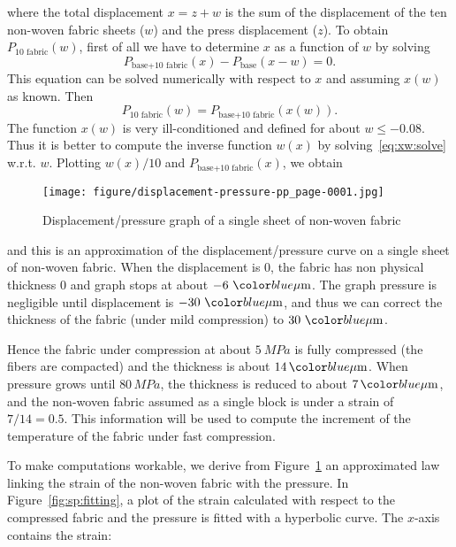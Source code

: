 where the total displacement $x=z+w$ is the sum of the displacement of the ten non-woven fabric sheets ($w$) and the press displacement ($z$). To obtain $P_{\textrm{10 fabric}}(w)$, first of all we have to determine $x$ as a function of $w$ by solving
\begin{equation}\label{eq:xw:solve}
  P_{\textrm{base}+\textrm{10 fabric}}(x)-
  P_{\textrm{base}}(x-w)= 0.
\end{equation}
This equation can be solved numerically with respect to $x$ and assuming $x(w)$ as known. Then
\[
  P_{\textrm{10 fabric}}(w) = P_{\textrm{base}+\textrm{10 fabric}}(x(w)).
\]
The function $x(w)$ is very ill-conditioned and defined for about $w\leq-0.08$. Thus it is better to compute the inverse function $w(x)$ by solving~\eqref{eq:xw:solve} w.r.t. $w$. Plotting $w(x)/10$ and $P_{\textrm{base}+\textrm{10 fabric}}(x)$, we obtain
\begin{figure}[H]
  \begin{center}
    \texttt{[image: figure/displacement-pressure-pp\_page-0001.jpg]}
  \end{center}
  \caption{Displacement/pressure graph of a single sheet of non-woven fabric}
  \label{fig:pp:pressure}
\end{figure}
and this is an approximation of the displacement/pressure curve on a single sheet of non-woven fabric. When the displacement is $0$, the fabric has non physical thickness $0$ and graph stops at about $-6 \ \unit{$\mu$m}$. The graph pressure is negligible until displacement is $-30 \ \unit{$\mu$m}$, and thus we can correct the thickness of the fabric (under mild compression) to $30 \ \unit{$\mu$m}$.
\par
Hence the fabric under compression at about $5 \ \unit{MPa}$ is fully compressed (the fibers are compacted) and the thickness is about $14\,\unit{$\mu$m}$. When pressure grows until $80\,\unit{MPa}$, the thickness is reduced to about $7\,\unit{$\mu$m}$, and the non-woven fabric assumed as a single block is under a strain of $7/14=0.5$. This information will be used to compute the increment of the temperature of the fabric under fast compression.
\par
To make computations workable, we derive from Figure~\ref{fig:pp:pressure} an approximated law linking the strain of the non-woven fabric with the pressure. In Figure~\ref{fig:sp:fitting}, a plot of the strain calculated with respect to the compressed fabric and the pressure is fitted with a hyperbolic curve. The $x$-axis contains the strain:
